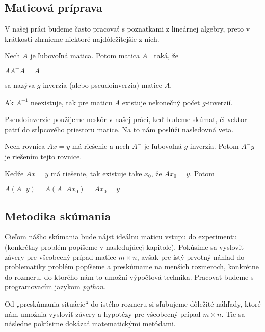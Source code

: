 \subsection{Maticová príprava}

V našej práci budeme často pracovať s poznatkami z lineárnej algebry, preto v krátkosti zhrnieme niektoré najdôležitejšie z nich.

\begin{defin}
Nech $A$ je ľubovoľná matica. Potom matica $A^-$ taká, že
\begin{center}
$A A^- A = A$
\end{center}
sa nazýva $g$-inverzia (alebo pseudoinverzia) matice $A$.
\end{defin}

\begin{com}
Ak $A^{-1}$ neexistuje, tak pre maticu $A$ existuje nekonečný počet $g$-inverzií.
\end{com}

Pseudoinverzie použijeme neskôr v našej práci, keď budeme skúmať, 
či vektor patrí do stĺpcového priestoru matice. Na to nám poslúži nasledovná veta.

\begin{theorem}
\label{veta3}
Nech rovnica $Ax = y$ má riešenie a nech $A^-$ je ľubovolná $g$-inverzia. Potom $A^- y$ je riešením tejto rovnice.
\end{theorem}

\begin{dokaz}
Keďže $Ax = y$ má riešenie, tak existuje take $x_0$, že $A x_0 = y$. Potom 
\begin{center}
$A (A^- y) = A(A^- A x_0) = A x_0 = y$
\end{center}
\end{dokaz}

\subsection{Metodika skúmania}

Cieľom nášho skúmania bude nájsť ideálnu maticu vstupu do experimentu (konkrétny problém popíšeme v nasledujúcej kapitole). 
Pokúsime sa vysloviť závery pre všeobecný prípad matice $m \times n$,
avšak pre istý prvotný náhľad do problematiky problém popíšeme a preskúmame na menších rozmeroch, 
konkrétne do rozmeru, do ktorého nám to umožní výpočtová technika. Pracovať budeme s programovacím jazykom \textit{python}.

Od „preskúmania situácie“ do istého rozmeru si sľubujeme dôležité náhľady, 
ktoré nám umožnia vysloviť závery a hypotézy pre všeobecný prípad $m \times n$. 
Tie sa následne pokúsime dokázať matematickými metódami.
